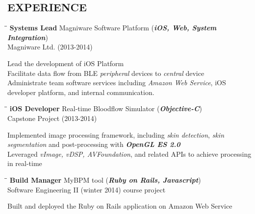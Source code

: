 \documentclass{res}
\begin{document}
\begin{resume}
\section{EXPERIENCE}
   \begin{tabbing}%
   \hspace{2.3in}\= \hspace{2.6in}\= \kill %
   {\bf Systems Lead}  \>Magniware Software Platform (\textbf{\textit{iOS, Web, System Integration}})\>\\
                          \>Magniware Ltd. (2013-2014)
   \end{tabbing}
   \vspace{-20pt}
    Lead the development of iOS Platform\\
    Facilitate data flow from BLE \textit{peripheral} devices to \textit{central} device\\
    Administrate team software services including \textit{Amazon Web Service}, iOS developer platform, and internal communication.
   \begin{tabbing}%
   \hspace{2.3in}\= \hspace{2.6in}\= \kill %
   {\bf iOS Developer}  \>Real-time Bloodflow Simulator (\textbf{\textit{Objective-C}})\>\\
                          \>Capstone Project (2013-2014)
   \end{tabbing}
   \vspace{-20pt}
    Implemented image processing framework, including \textit{skin detection}, \textit{skin segmentation} and post-processing with \textbf{\textit{OpenGL ES 2.0}}\\
    Leveraged \textit{vImage, vDSP, AVFoundation}, and related APIs to achieve processing in real-time
   \begin{tabbing}
   \hspace{2.3in}\= \hspace{2.6in}\= \kill %
    {\bf Build Manager} \>MyBPM tool (\textbf{\textit{Ruby on Rails, Javascript}})\>\\
                          \>Software Engineering II (winter 2014) course project
   \end{tabbing}
   \vspace{-20pt}
    Built and deployed the Ruby on Rails application on Amazon Web Service\\

\end{resume}
\end{document}

